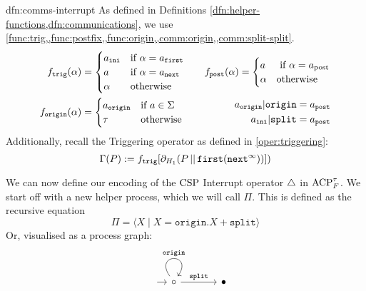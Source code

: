 \documentclass[../hons_project.tex]{subfiles}
\begin{document}
\begin{dfn}{dfn:comms-interrupt}{}
	As defined in Definitions \cref{dfn:helper-functions,dfn:communications}, we use \cref{func:trig,,func:postfix,,func:origin,,comm:origin,,comm:split-split}.
	\begin{align*}
		f_{\mathtt{trig}}(\alpha) & = \begin{cases}
			                              a_{\mathtt{ini}} & \text{if } \alpha = a_{\mathtt{first}} \\
			                              a                & \text{if } \alpha = a_{\mathtt{next}}  \\
			                              \alpha           & \text{otherwise}
		                              \end{cases} \quad
		                          & f_{\mathtt{post}}(\alpha) = \begin{cases}
			                                                                    a      & \text{ if } \alpha = a_{\mathrm{post}} \\
			                                                                    \alpha & \text{otherwise}
		                                                                    \end{cases}\\
		\fdef{origin}(\alpha)     & = \begin{cases}
			                              a_{\mathtt{origin}} & \text{if } a\in\Sigma \\
			                              \tau                & \text{otherwise}
		                              \end{cases}  & \begin{split}
									  a_{\mathtt{origin}} | \mathtt{origin}  = a_{\mathtt{post}}&\\
									  a_{\mathtt{ini}} | \mathtt{split} = a_{\mathtt{post}}&
		                            \end{split}
	\end{align*}
	Additionally, recall the Triggering operator as defined in \ref{oper:triggering}:
	\[\Gamma(P) := f_{\mathtt{trig}}[\partial_{H_{1}}(P \merge \mathtt{first}(\mathtt{next}^{\infty}))])\]
\end{dfn}

We can now define our encoding of the $\csp$ Interrupt operator $\interrupt$ in $\acptf$. We start off with a new helper process, which we will call $\Pi$. This is defined as the recursive equation
\[\Pi = \langle X \mid X = \mathtt{origin}.X + \mathtt{split} \rangle\]
Or, visualised as a process graph:
\[\begin{tikzcd}[column sep=scriptsize, row sep=scriptsize]
		{} & \circ && \bullet
		\arrow[shorten <=8pt, from=1-1, to=1-2]
		\arrow["{\mathtt{origin}}", from=1-2, to=1-2, loop, in=55, out=125, distance=10mm]
		\arrow["{\mathtt{split}}", from=1-2, to=1-4]
	\end{tikzcd}\]
\end{document}
